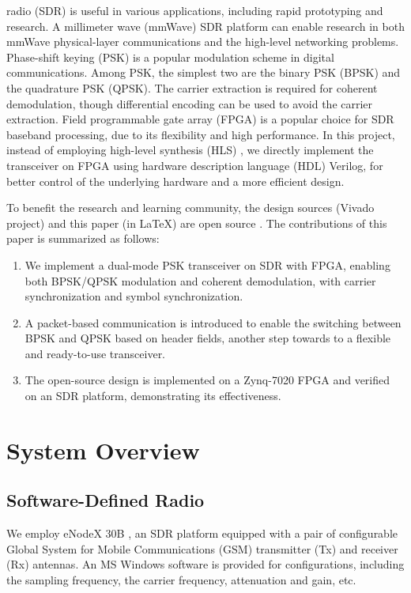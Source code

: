 \documentclass[journal,twoside]{IEEEtran}
\begin{document}
     radio (SDR) is useful in various applications,
    including rapid prototyping and research.
    A millimeter wave (mmWave) SDR platform \cite{zhao2020m} can enable research in both mmWave physical-layer communications
    and the high-level networking problems.
    Phase-shift keying (PSK) is a popular modulation scheme in digital communications.
    Among PSK, the simplest two are the binary PSK (BPSK) and the quadrature PSK (QPSK).
    The carrier extraction is required for coherent demodulation,
    though differential encoding can be used to avoid the carrier extraction.
    Field programmable gate array (FPGA) is a popular choice for SDR baseband processing,
    due to its flexibility and high performance.
    In this project,
    instead of employing high-level synthesis (HLS) \cite{zhao2023flexible},
    we directly implement the transceiver on FPGA using hardware description language (HDL) Verilog,
    for better control of the underlying hardware and a more efficient design.

    To benefit the research and learning community,
    the design sources (Vivado project) and this paper (in \LaTeX) are open source \cite{github_repo}.
    The contributions of this paper is summarized as follows:
    \begin{enumerate}
      \item We implement a dual-mode PSK transceiver on SDR with FPGA, enabling both BPSK/QPSK modulation and coherent demodulation,
      with carrier synchronization and symbol synchronization.
      \item A packet-based communication is introduced to enable the switching between BPSK and QPSK based on header fields,
      another step towards to a flexible and ready-to-use transceiver.
      \item The open-source design is implemented on a Zynq-7020 FPGA and verified on an SDR platform, demonstrating its effectiveness.
    \end{enumerate}

  \section{System Overview}

    \subsection{Software-Defined Radio}

      We employ eNodeX 30B \cite{eNodeX}, an SDR platform equipped with a pair of
      configurable Global System for Mobile Communications (GSM) transmitter (Tx) and receiver (Rx) antennas.
      An MS Windows software is provided for configurations,
      including the sampling frequency, the carrier frequency, attenuation and gain, etc.
\end{document}
